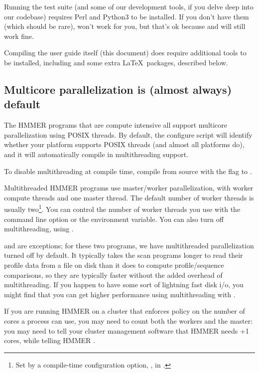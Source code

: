 Running the test suite (and some of our development tools, if you
delve deep into our codebase) requires Perl and Python3 to be
installed.  If you don't have them (which should be rare),  won't work for you, but that's ok because  and
 will still work fine.

Compiling the user guide itself (this document) does require
additional tools to be installed, including  and some
extra \LaTeX\ packages, described below.


\subsection{Multicore parallelization is (almost always) default}

The HMMER programs that are compute intensive all support multicore
parallelization using POSIX threads. By default, the configure script
will identify whether your platform supports POSIX threads (and almost
all platforms do), and it will automatically compile in multithreading
support.

To disable multithreading at compile time, compile from source with
the  flag to .

Multithreaded HMMER programs use master/worker parallelization, with
 worker compute threads and one master thread.  The default
number of worker threads is usually two\footnote{Set by a compile-time
configuration option, , in
.}. You can control the number of worker
threads you use with the  command line option or
the  environment variable. You can also turn off
multithreading, using .

 and  are exceptions; for these two
programs, we have multithreaded parallelization turned off by
default. It typically takes the scan programs longer to read their
profile data from a file on disk than it does to compute
profile/sequence comparisons, so they are typically faster without the
added overhead of multithreading.  If you happen to have some sort of
lightning fast disk i/o, you might find that you can get higher
performance using multithreading with .

If you are running HMMER on a cluster that enforces policy on the
number of cores a process can use, you may need to count both the
workers and the master: you may need to tell your cluster management
software that HMMER needs +1 cores, while telling HMMER
.



